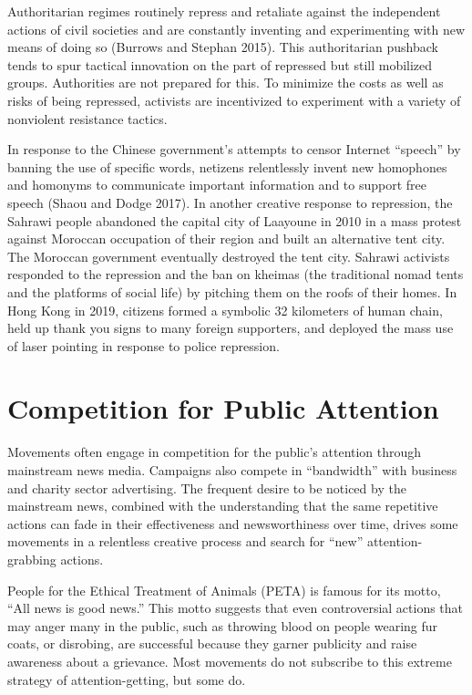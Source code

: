\documentclass[twoside,a4paper,12pt,fleqn,openany]{extbook}
\begin{document}
Authoritarian regimes routinely repress and retaliate against the independent actions of civil societies and are constantly inventing and experimenting with new means of doing so (Burrows and Stephan 2015). This authoritarian pushback tends to spur tactical innovation on the part of repressed but still mobilized groups. Authorities are not prepared for this. To minimize the costs as well as risks of being repressed, activists are incentivized to experiment with a variety of nonviolent resistance tactics.

In response to the Chinese government’s attempts to censor Internet “speech” by banning the use of specific words, netizens relentlessly invent new homophones and homonyms to communicate important information and to support free speech (Shaou and Dodge 2017). In another creative response to repression, the Sahrawi people abandoned the capital city of Laayoune in 2010 in a mass protest against Moroccan occupation of their region and built an alternative tent city. The Moroccan government eventually destroyed the tent city. Sahrawi activists responded to the repression and the ban on kheimas (the traditional nomad tents and the platforms of social life) by pitching them on the roofs of their homes. In Hong Kong in 2019, citizens formed a symbolic 32 kilometers of human chain, held up thank you signs to many foreign supporters, and deployed the mass use of laser pointing in response to police repression.

\section*{Competition for Public Attention}

Movements often engage in competition for the public’s attention through mainstream news media. Campaigns also compete in “bandwidth” with business and charity sector advertising. The frequent desire to be noticed by the mainstream news, combined with the understanding that the same repetitive actions can fade in their effectiveness and newsworthiness over time, drives some movements in a relentless creative process and search for “new” attention-grabbing actions.

People for the Ethical Treatment of Animals (PETA) is famous for its motto, “All news is good news.” This motto suggests that even controversial actions that may anger many in the public, such as throwing blood on people wearing fur coats, or disrobing, are successful because they garner publicity and raise awareness about a grievance. Most movements do not subscribe to this extreme strategy of attention-getting, but some do.
\end{document}
